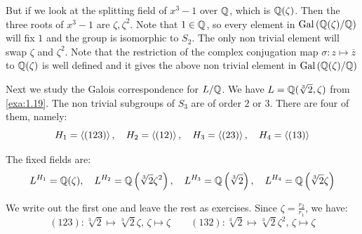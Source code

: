 \documentclass[twoside = false,	%
		headsepline,		%
		parskip = true,
		]{scrbook}						%
\begin{document}
        But if we look at the splitting field of $x^3 - 1$ over $\mathbb Q$, which is $\mathbb Q(\zeta)$. Then the three roots of $x^3 - 1$ are $\zeta,\zeta^2$. Note that $1 \in \mathbb Q$, so every element in $\mathrm{Gal}\left( \mathbb Q(\zeta)/\mathbb Q\right)$ will fix $1$ and the group is isomorphic to $S_2$. The only non trivial element will swap $\zeta$ and $\zeta^2$. Note that the restriction of the complex conjugation map $\sigma:z \mapsto \overline{z}$ to $\mathbb Q(\zeta)$ is well defined and it gives the above non trivial element in $\mathrm{Gal}\left( \mathbb Q(\zeta)/\mathbb Q\right)$
        
        
        \begin{center}
        \end{center}
        Next we study the Galois correspondence for $L/\mathbb Q$. We have $L = \mathbb Q(\sqrt[3]{2},\zeta)$ from \ref{exa:1.19}. The non trivial subgroups of $S_3$ are of order $2$ or $3$. There are four of them, namely:
        \begin{equation*}
            H_1 = \left\langle (123)\right\rangle, \quad H_2 = \left\langle (12)\right\rangle, \quad H_3 = \left\langle (23)\right\rangle, \quad H_4 = \left\langle (13)\right\rangle
        \end{equation*}
        
        The fixed fields are:
        \begin{equation*}
            L^{H_1} = \mathbb Q(\zeta), \quad L^{H_2} = \mathbb Q\left( \sqrt[3]{2} \zeta^2\right), \quad L^{H_3} = \mathbb Q\left( \sqrt[3]{2}\right), \quad L^{H_4} = \mathbb Q\left( \sqrt[3]{2}\zeta\right)
        \end{equation*}
        
        We write out the first one and leave the rest as exercises. Since $\zeta = \frac{r_2}{r_1}$, we have:
	    \begin{equation*}
			(123): \sqrt[3]{2} \mapsto \sqrt[3]{2}\zeta, \, \zeta \mapsto \zeta \qquad (132): \sqrt[3]{2} \mapsto \sqrt[3]{2} \zeta^2, \, \zeta \mapsto \zeta
    	\end{equation*}
    	
\end{document}

